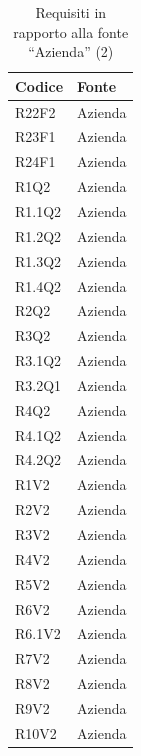 	\begin{table}[H]
		{\def\arraystretch{1.5}
		\begin{tabularx}{\textwidth}{XX}
			\rowcolor{beautyblue}
			\textbf{Codice} &
			\textbf{Fonte} \\ \hline
			
			R22F2 & Azienda \\
			R23F1 & Azienda \\
			R24F1 & Azienda \\
			R1Q2 & Azienda \\
			R1.1Q2 & Azienda \\
			R1.2Q2 & Azienda \\
			R1.3Q2 & Azienda \\
			R1.4Q2 & Azienda \\
			R2Q2 & Azienda \\
			R3Q2 & Azienda \\
			R3.1Q2 & Azienda \\
			R3.2Q1 & Azienda \\
			R4Q2 & Azienda \\
			R4.1Q2 & Azienda \\
			R4.2Q2 & Azienda \\
			R1V2 & Azienda \\
			R2V2 & Azienda \\
			R3V2 & Azienda \\
			R4V2 & Azienda \\
			R5V2 & Azienda \\
			R6V2 & Azienda \\
			R6.1V2 & Azienda \\
			R7V2 & Azienda \\
			R8V2 & Azienda \\
			R9V2 & Azienda \\
			R10V2 & Azienda \\

			\bottomrule
		\end{tabularx}} \\
	\caption{Requisiti in rapporto alla fonte ``Azienda'' (2)}
	\end{table}


